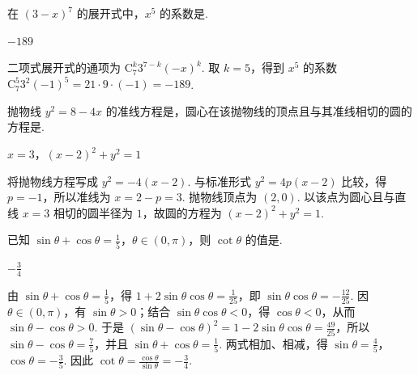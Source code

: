 \begin{problem}
在 \((3 - x)^7\) 的展开式中，\(x^5\) 的系数是\fillinblank{}.
\end{problem}

\begin{answer}
\(-189\)
\end{answer}

\begin{solution}
二项式展开式的通项为 \(\mathrm C_{7}^{k}3^{7-k}(-x)^k\). 取 \(k=5\)，得到 \(x^5\) 的系数 \(\mathrm C_{7}^{5}3^2(-1)^5=21\cdot9\cdot(-1)=-189\).
\end{solution}

\begin{problem}
抛物线 \(y^{2} = 8 - 4x \) 的准线方程是\fillinblank{}，圆心在该抛物线的顶点且与其准线相切的圆的方程是\fillinblank{}.
\end{problem}

\begin{answer}
\(x=3\)，\(\left(x-2\right)^2+y^2=1\)
\end{answer}

\begin{solution}
将抛物线方程写成 \(y^2=-4(x-2)\). 与标准形式 \(y^2=4p(x-2)\) 比较，得 \(p=-1\)，所以准线为 \(x=2-p=3\). 抛物线顶点为 \((2,0)\). 以该点为圆心且与直线 \(x=3\) 相切的圆半径为 \(1\)，故圆的方程为 \((x-2)^2+y^2=1\).
\end{solution}

\begin{problem}
已知 \(\sin \theta + \cos \theta = \frac{1}{5}\)，\(\theta \in (0, \pi)\)，则 \(\cot \theta\) 的值是\fillinblank{}.
\end{problem}

\begin{answer}
\(-\frac{3}{4}\)
\end{answer}

\begin{solution}
由 \(\sin\theta+\cos\theta=\frac{1}{5}\)，得 \(1+2\sin\theta\cos\theta=\frac{1}{25}\)，即 \(\sin\theta\cos\theta=-\frac{12}{25}\). 因 \(\theta\in(0,\pi)\)，有 \(\sin\theta>0\)；结合 \(\sin\theta\cos\theta<0\)，得 \(\cos\theta<0\)，从而 \(\sin\theta-\cos\theta>0\). 于是 \((\sin\theta-\cos\theta)^2=1-2\sin\theta\cos\theta=\frac{49}{25}\)，所以 \(\sin\theta-\cos\theta=\frac{7}{5}\)，并且 \(\sin\theta+\cos\theta=\frac15\).
两式相加、相减，得 \(\sin\theta=\frac{4}{5}\)，\(\cos\theta=-\frac{3}{5}\). 因此
\(\cot\theta=\frac{\cos\theta}{\sin\theta}=-\frac34\).
\end{solution}

